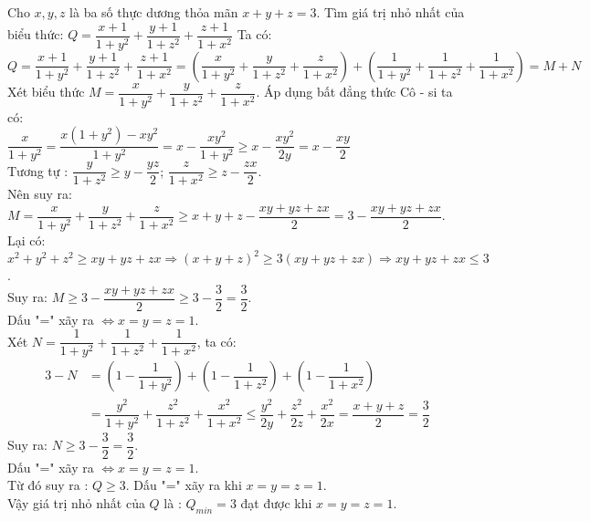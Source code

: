 \begin{ex}%
Cho $x,y,z$ là ba số thực dương thỏa mãn $x+y+z=3$. Tìm giá trị nhỏ nhất của biểu thức: 
$Q=\dfrac{x+1}{1+y^2}+\dfrac{y+1}{1+z^2}+\dfrac{z+1}{1+x^2}$
\loigiai
    {
   Ta có: \\ $Q=\dfrac{x+1}{1+y^2}+\dfrac{y+1}{1+z^2}+\dfrac{z+1}{1+x^2}=\left(\dfrac{x}{1+y^2}+\dfrac{y}{1+z^2}+\dfrac{z}{1+x^2}\right)+\left(\dfrac{1}{1+y^2}+\dfrac{1}{1+z^2}+\dfrac{1}{1+x^2}\right)=M+N$\\
   Xét biểu thức $M=\dfrac{x}{1+y^2}+\dfrac{y}{1+z^2}+\dfrac{z}{1+x^2}$. Áp dụng bất đẳng thức Cô - si ta có: \\
   $\dfrac{x}{1+y^2}=\dfrac{x(1+y^2)-xy^2}{1+y^2}=x-\dfrac{xy^2}{1+y^2}\geq x-\dfrac{xy^2}{2y}=x-\dfrac{xy}{2}$\\
   Tương tự : $\dfrac{y}{1+z^2}\geq y-\dfrac{yz}{2}$;  $\dfrac{z}{1+x^2}\geq z-\dfrac{zx}{2}$.\\ Nên suy ra: 
   $M=\dfrac{x}{1+y^2}+\dfrac{y}{1+z^2}+\dfrac{z}{1+x^2}\geq x+y+z-\dfrac{xy+yz+zx}{2}=3-\dfrac{xy+yz+zx}{2}$.\\
   Lại có: $x^2+y^2+z^2\geq xy+yz+zx\Rightarrow (x+y+z)^2\geq 3(xy+yz+zx)\Rightarrow xy+yz+zx\leq 3$.\\
   Suy ra: $M\geq 3-\dfrac{xy+yz+zx}{2}\geq 3-\dfrac{3}{2}=\dfrac{3}{2}$.\\
   Dấu "=" xãy ra $\Leftrightarrow x=y=z=1$.\\
   Xét $N=\dfrac{1}{1+y^2}+\dfrac{1}{1+z^2}+\dfrac{1}{1+x^2}$, ta có: 
   \begin{align*}
   3-N&=\left(1-\dfrac{1}{1+y^2}\right)+\left(1-\dfrac{1}{1+z^2}\right)+\left(1-\dfrac{1}{1+x^2}\right)\\
   &=\dfrac{y^2}{1+y^2}+\dfrac{z^2}{1+z^2}+\dfrac{x^2}{1+x^2}\leq \dfrac{y^2}{2y}+\dfrac{z^2}{2z}+\dfrac{x^2}{2x}=\dfrac{x+y+z}{2}=\dfrac{3}{2}
   \end{align*}
   Suy ra: $N\geq 3-\dfrac{3}{2}=\dfrac{3}{2}$.\\
   Dấu "=" xãy ra $\Leftrightarrow x=y=z=1$.\\
   Từ đó suy ra : $Q\geq 3$. Dấu "=" xãy ra khi $x=y=z=1$.\\
   Vậy giá trị nhỏ nhất của $Q$ là : $Q_{min}=3$ đạt được khi $x=y=z=1$.
    }
\end{ex}
